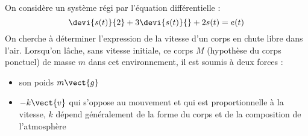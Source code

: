 \clearpage
On considère un système régi par l'équation différentielle :
\[
\devi{s(t)}{2}+3\devi{s(t)}{}+2s(t)=e(t)
\]
On cherche à déterminer l'expression de la vitesse d'un corps en chute libre 
dans l'air. 
Lorsqu'on lâche, sans vitesse initiale, ce corps $M$ (hypothèse du corps 
ponctuel) de masse $m$
dans cet environnement, il est soumis à deux forces :
\begin{itemize}
    \item son poids $m\vect{g}$
    \item $-k\vect{v}$ qui s'oppose au mouvement et qui 
        est proportionnelle à la vitesse, $k$ dépend généralement 
        de la forme du corps et de la composition de l'atmosphère
\end{itemize}
